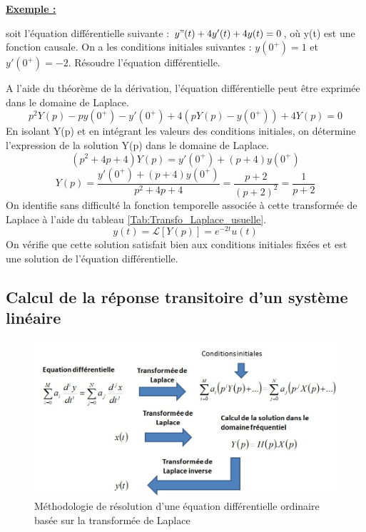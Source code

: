 	\vspace{1\baselineskip}
	
	\textbf{\underline{Exemple :}} 
	
	soit l'équation différentielle suivante : $y"(t)+4y'(t)+4y(t)=0$, où y(t) est une fonction causale. On a les conditions initiales suivantes : $y(0^{+})=1$ et $y'(0^{+})=-2$. Résoudre l'équation différentielle.
	
	A l'aide du théorème de la dérivation, l'équation différentielle peut être exprimée dans le domaine de Laplace.
	\begin{equation*}
	p^{2}Y(p)-py(0^{+})-y'(0^{+})+4(pY(p)-y(0^{+}))+4Y(p)=0
	\end{equation*}
	En isolant Y(p) et en intégrant les valeurs des conditions initiales, on détermine l'expression de la solution Y(p) dans le domaine de Laplace.
	\begin{equation*}
	(p^{2}+4p+4)Y(p)=y'(0^{+})+(p+4)y(0^{+})
	\end{equation*}
	\begin{equation*}
	Y(p)=\frac{y'(0^{+})+(p+4)y(0^{+})}{p^{2}+4p+4}=\frac{p+2}{(p+2)^{2}}=\frac{1}{p+2}
	\end{equation*}
	On identifie sans difficulté la fonction temporelle associée à cette transformée de Laplace à l'aide du tableau \ref{Tab:Transfo_Laplace_usuelle}.
	\begin{equation*}
	y(t)=\mathcal{L}[Y(p)]=e^{-2t}u(t)
	\end{equation*}
	On vérifie que cette solution satisfait bien aux conditions initiales fixées et est une solution de l'équation différentielle.
	
	
	\vspace{1\baselineskip}
	
	\subsection{Calcul de la réponse transitoire d'un système linéaire}
	
	\begin{figure}[h!]
		\centering
		\includegraphics[scale=0.6]{images/Methodo_reso_equa_diff_Laplace.jpg}
		\caption{Méthodologie de résolution d'une équation différentielle ordinaire basée sur la transformée de Laplace}	
		\label{Fig:Methodo_reso_equa_diff_Laplace} 
	\end{figure}
	
